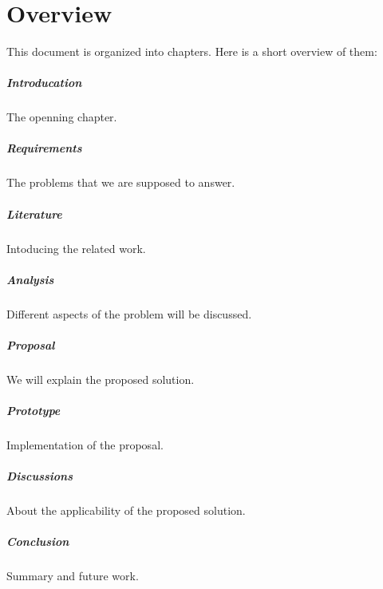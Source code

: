 \section{Overview}
This document is organized into  chapters. Here is a short overview of them:
\subparagraph{Introducation} The openning chapter.
\subparagraph{Requirements} The problems that we are supposed to answer.
\subparagraph{Literature} Intoducing the related work.
\subparagraph{Analysis} Different aspects of the problem will be discussed.
\subparagraph{Proposal} We will explain the proposed solution.
\subparagraph{Prototype} Implementation of the proposal.
\subparagraph{Discussions} About the applicability of the proposed solution.
\subparagraph{Conclusion} Summary and future work.